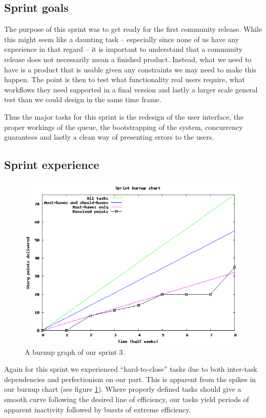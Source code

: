 \documentclass[a4paper,11pt]{article}
\begin{document}
\subsection{Sprint goals}
The purpose of this sprint was to get ready for the first community release.
While this might seem like a daunting task -- especially since none of us have
any experience in that regard -- it is important to understand that a community
release does not necessarily mean a finished product. Instead, what we need to
have is a product that is usable given any constraints we may need to make this
happen. The point is then to test what functionality real users require, what
workflows they need supported in a final version and lastly a larger scale general
test than we could design in the same time frame.

Thus the major tasks for this sprint is the redesign of the user interface, the
proper workings of the queue, the bootstrapping of the system, concurrency
guarantees and lastly a clean way of presenting errors to the users.

\subsection{Sprint experience}
\begin{figure}[!ht]
	\centering
	\includegraphics[width=\textwidth/2]{img/burndown.png}
	\caption{A burnup graph of our sprint 3.}
	\label{fig:burnup}
\end{figure}
Again for this sprint we experienced ``hard-to-close'' tasks due to both inter-task
dependencies and perfectionism on our part. This is apparent from the spikes in
our burnup chart (see figure \ref{fig:burnup}). Where properly defined tasks should give a
smooth curve following the desired line of efficiency, our tasks yield periods of
apparent inactivity followed by bursts of extreme efficiency.
\end{document}
